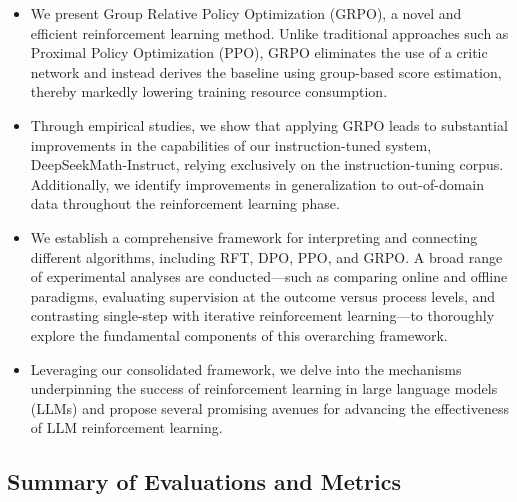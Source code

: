 \begin{itemize}[topsep=0pt]
    \item We present Group Relative Policy Optimization (GRPO), a novel and efficient reinforcement learning method. Unlike traditional approaches such as Proximal Policy Optimization (PPO), GRPO eliminates the use of a critic network and instead derives the baseline using group-based score estimation, thereby markedly lowering training resource consumption.
    \item Through empirical studies, we show that applying GRPO leads to substantial improvements in the capabilities of our instruction-tuned system, DeepSeekMath-Instruct, relying exclusively on the instruction-tuning corpus. Additionally, we identify improvements in generalization to out-of-domain data throughout the reinforcement learning phase.
    \item We establish a comprehensive framework for interpreting and connecting different algorithms, including RFT, DPO, PPO, and GRPO. A broad range of experimental analyses are conducted—such as comparing online and offline paradigms, evaluating supervision at the outcome versus process levels, and contrasting single-step with iterative reinforcement learning—to thoroughly explore the fundamental components of this overarching framework.
    \item Leveraging our consolidated framework, we delve into the mechanisms underpinning the success of reinforcement learning in large language models (LLMs) and propose several promising avenues for advancing the effectiveness of LLM reinforcement learning.
\end{itemize}

\subsection{Summary of Evaluations and Metrics}

